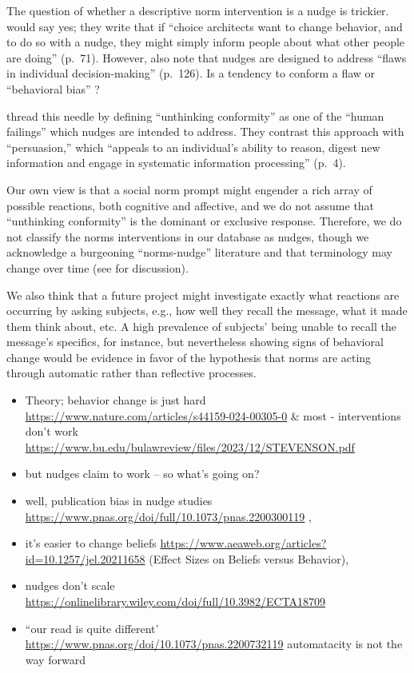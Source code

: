 \documentclass[sn-nature,pdflatex]{sn-jnl}
\begin{document}
The question of whether a descriptive norm intervention is a nudge is
trickier. \citep{thaler2009} would say yes; they write that if ``choice
architects want to change behavior, and to do so with a nudge, they
might simply inform people about what other people are doing'' (p.~71).
However, \citep{hausman2010} also note that nudges are designed to
address ``flaws in individual decision-making'' (p.~126). Is a tendency
to conform a flaw or ``behavioral bias''
\citep[p.~362]{kantorowicz2021}?

\citep{mols2015} thread this needle by defining ``unthinking
conformity'' as one of the ``human failings'' which nudges are intended
to address. They contrast this approach with ``persuasion,'' which
``appeals to an individual's ability to reason, digest new information
and engage in systematic information processing'' (p.~4).

Our own view is that a social norm prompt might engender a rich array of
possible reactions, both cognitive and affective, and we do not assume
that ``unthinking conformity'' is the dominant or exclusive response.
Therefore, we do not classify the norms interventions in our database as
nudges, though we acknowledge a burgeoning ``norms-nudge'' literature
and that terminology may change over time (see \citep{bicchieri2023} for
discussion).

We also think that a future project might investigate exactly what
reactions are occurring by asking subjects, e.g., how well they recall
the message, what it made them think about, etc. A high prevalence of
subjects' being unable to recall the message's specifics, for instance,
but nevertheless showing signs of behavioral change would be evidence in
favor of the hypothesis that norms are acting through automatic rather
than reflective processes.

\begin{itemize}
\item
  Theory; behavior change is just hard
  \url{https://www.nature.com/articles/s44159-024-00305-0} \& most -
  interventions don't work
  \url{https://www.bu.edu/bulawreview/files/2023/12/STEVENSON.pdf}
\item
  but nudges claim to work -- so what's going on?
\item
  well, publication bias in nudge studies
  \url{https://www.pnas.org/doi/full/10.1073/pnas.2200300119} ,
\item
  it's easier to change beliefs
  \url{https://www.aeaweb.org/articles?id=10.1257/jel.20211658} (Effect
  Sizes on Beliefs versus Behavior),
\item
  nudges don't scale
  \url{https://onlinelibrary.wiley.com/doi/full/10.3982/ECTA18709}
\item
  ``our read is quite different'
  \url{https://www.pnas.org/doi/10.1073/pnas.2200732119} automatacity is
  not the way forward
\end{itemize}

\renewcommand\refname{References}

\end{document}
